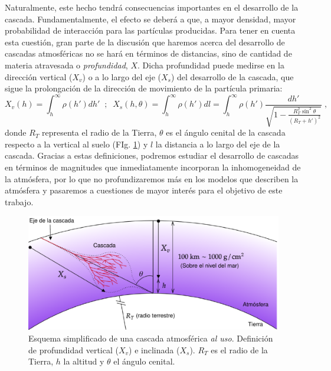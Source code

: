 \documentclass[11 pt, a4paper]{article} %
\numberwithin{equation}{section}
\numberwithin{figure}{section}
\numberwithin{table}{section}
\begin{document}
Naturalmente, este hecho tendrá consecuencias importantes en el desarrollo de la cascada. Fundamentalmente, el efecto se deberá a que, a mayor densidad, mayor probabilidad de interacción para las partículas producidas. Para tener en cuenta esta cuestión, gran parte de la discusión que haremos acerca del desarrollo de cascadas atmosféricas no se hará en términos de distancias, sino de cantidad de materia atravesada o \textit{profundidad}, $X$. Dicha profundidad puede medirse en la dirección vertical ($X_v$) o a lo largo del eje ($X_s$) del desarrollo de la cascada, que sigue la prolongación de la dirección de movimiento de la partícula primaria:
\begin{equation}
	X_v(h)=\int_{h}^\infty\rho(h')dh'\;\;;\;\;X_s(h,\theta)=\int_{h}^\infty\rho(h')dl=\int_h^{\infty}\rho(h')\frac{dh'}{\sqrt{1-\frac{R_T^2\sin^2{\theta}}{\left(R_T+h'\right)^2}}}\;,\label{ec22}
\end{equation}
donde $R_T$ representa el radio de la Tierra, $\theta$ es el ángulo cenital de la cascada respecto a la vertical al suelo (FIg. \ref{shower_params}) y $l$ la distancia a lo largo del eje de la cascada. Gracias a estas definiciones, podremos estudiar el desarrollo de cascadas en términos de magnitudes que inmediatamente incorporan la inhomogeneidad de la atmósfera, por lo que no profundizaremos más en los modelos que describen la atmósfera y pasaremos a cuestiones de mayor interés para el objetivo de este trabajo.

\begin{figure}[H]
	\centering
	\includegraphics[width=.7\linewidth]{figures/cascadas/shower_params_v2}
	\caption{Esquema simplificado de una cascada atmosférica \textit{al uso}. Definición de profundidad vertical ($X_v$) e inclinada ($X_s$). $R_T$ es el radio de la Tierra, $h$ la altitud y $\theta$ el ángulo cenital.}
	\label{shower_params}
\end{figure}
\end{document}
